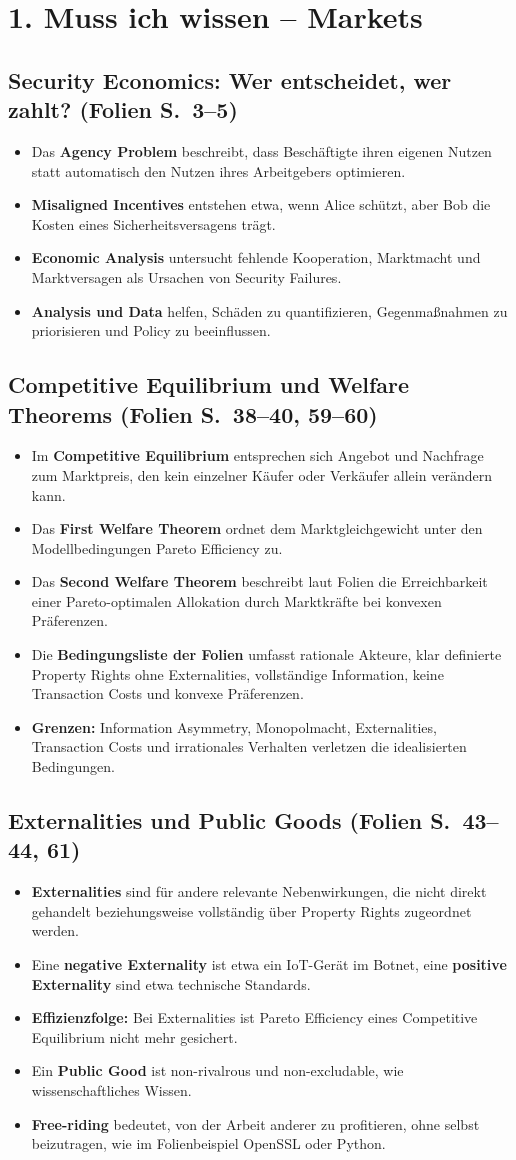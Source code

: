 \documentclass[11pt,a4paper]{article}
\newcommand{\block}[2]{\subsection*{#1 {\normalfont\small (Folien S.~#2)}}}
\begin{document}
\newpage
\section*{1. Muss ich wissen -- Markets}
\block{Security Economics: Wer entscheidet, wer zahlt?}{3--5}
\begin{itemize}
\item Das \textbf{Agency Problem} beschreibt, dass Beschäftigte ihren eigenen Nutzen statt automatisch den Nutzen ihres Arbeitgebers optimieren.
\item \textbf{Misaligned Incentives} entstehen etwa, wenn Alice schützt, aber Bob die Kosten eines Sicherheitsversagens trägt.
\item \textbf{Economic Analysis} untersucht fehlende Kooperation, Marktmacht und Marktversagen als Ursachen von Security Failures.
\item \textbf{Analysis und Data} helfen, Schäden zu quantifizieren, Gegenmaßnahmen zu priorisieren und Policy zu beeinflussen.
\end{itemize}
\block{Competitive Equilibrium und Welfare Theorems}{38--40, 59--60}
\begin{itemize}
\item Im \textbf{Competitive Equilibrium} entsprechen sich Angebot und Nachfrage zum Marktpreis, den kein einzelner Käufer oder Verkäufer allein verändern kann.
\item Das \textbf{First Welfare Theorem} ordnet dem Marktgleichgewicht unter den Modellbedingungen Pareto Efficiency zu.
\item Das \textbf{Second Welfare Theorem} beschreibt laut Folien die Erreichbarkeit einer Pareto-optimalen Allokation durch Marktkräfte bei konvexen Präferenzen.
\item Die \textbf{Bedingungsliste der Folien} umfasst rationale Akteure, klar definierte Property Rights ohne Externalities, vollständige Information, keine Transaction Costs und konvexe Präferenzen.
\item \textbf{Grenzen:} Information Asymmetry, Monopolmacht, Externalities, Transaction Costs und irrationales Verhalten verletzen die idealisierten Bedingungen.
\end{itemize}
\block{Externalities und Public Goods}{43--44, 61}
\begin{itemize}
\item \textbf{Externalities} sind für andere relevante Nebenwirkungen, die nicht direkt gehandelt beziehungsweise vollständig über Property Rights zugeordnet werden.
\item Eine \textbf{negative Externality} ist etwa ein IoT-Gerät im Botnet, eine \textbf{positive Externality} sind etwa technische Standards.
\item \textbf{Effizienzfolge:} Bei Externalities ist Pareto Efficiency eines Competitive Equilibrium nicht mehr gesichert.
\item Ein \textbf{Public Good} ist non-rivalrous und non-excludable, wie wissenschaftliches Wissen.
\item \textbf{Free-riding} bedeutet, von der Arbeit anderer zu profitieren, ohne selbst beizutragen, wie im Folienbeispiel OpenSSL oder Python.
\end{itemize}
\end{document}
